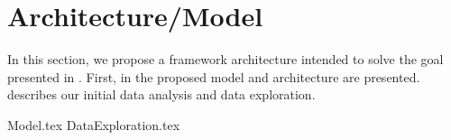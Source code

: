 \chapter{Architecture/Model}
\label{section:Architecture}

In this section, we propose a framework architecture intended to solve the goal presented in .
First, in  the proposed model and architecture are presented.
 describes our initial data analysis and data exploration.

{Model.tex}
{DataExploration.tex}
